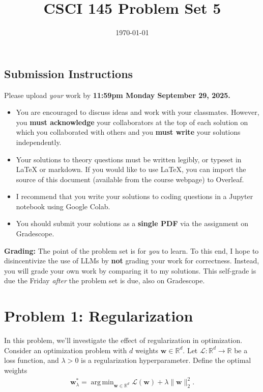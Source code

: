 \documentclass{article}
\title{CSCI 145 Problem Set 5}
\author{} %
\date{\today}
\DeclareMathOperator*{\argmin}{arg\,min}
\begin{document}
\maketitle

\subsection*{Submission Instructions}

Please upload \textit{your} work by
\textbf{11:59pm Monday September 29, 2025.}
\begin{itemize}
\item You are encouraged to discuss ideas
and work with your classmates. However, you
\textbf{must acknowledge} your collaborators
at the top of each solution on which
you collaborated with others 
and you \textbf{must write} your solutions
independently.
\item Your solutions to theory questions must
be written legibly, or typeset in LaTeX or markdown.
If you would like to use LaTeX, you can import the source of this document (available from the course webpage) to Overleaf.
\item I recommend that you write your solutions to coding questions in a Jupyter notebook using Google Colab.
\item You should submit your solutions as a \textbf{single PDF} via the assignment on Gradescope.
\end{itemize}

\noindent
\textbf{Grading:} The point of the problem set is for \textit{you} to learn. To this end, I hope to disincentivize the use of LLMs by \textbf{not} grading your work for correctness. Instead, you will grade your own work by comparing it to my solutions. This self-grade is due the Friday \textit{after} the problem set is due, also on Gradescope.

\newpage
\section*{Problem 1: Regularization}

In this problem, we'll investigate the effect of regularization in optimization.
Consider an optimization problem with $d$ weights $\mathbf{w} \in \mathbb{R}^d$.
Let $\mathcal{L}: \mathbb{R}^d \to \mathbb{R}$ be a loss function, and $\lambda > 0$ is a regularization hyperparameter.
Define the optimal weights
\begin{align}
    \mathbf{w}^*_\lambda = \argmin_{\mathbf{w} \in \mathbb{R}^d} 
    \mathcal{L}(\mathbf{w}) + \lambda \| \mathbf{w}\|_2^2.
\end{align}
\end{document}
